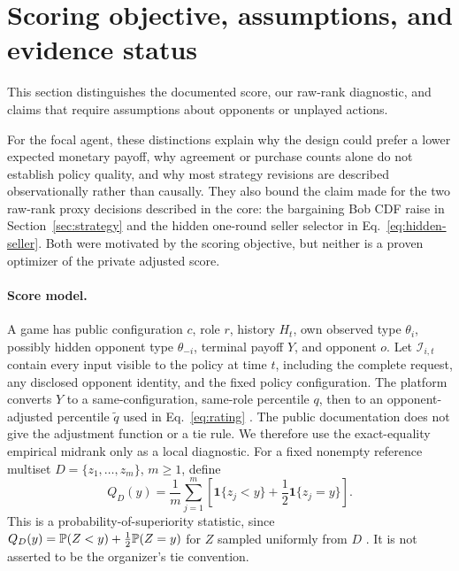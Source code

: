 \raggedbottom
\section{Scoring objective, assumptions, and evidence status}
\label{app:objective}

This section distinguishes the documented score, our raw-rank diagnostic, and
claims that require assumptions about opponents or unplayed actions.

For the focal agent, these distinctions explain why the design could prefer a
lower expected monetary payoff, why agreement or purchase counts alone do not
establish policy quality, and why most strategy revisions are described
observationally rather than causally. They also bound the claim made for the two
raw-rank proxy decisions described in the core: the bargaining Bob CDF raise in
Section~\ref{sec:strategy} and the hidden one-round seller selector in
Eq.~\eqref{eq:hidden-seller}. Both were motivated by the scoring objective, but
neither is a proven optimizer of the private adjusted score.

\paragraph{Score model.}
A game has public configuration $c$, role $r$, history $H_t$, own observed type
$\theta_i$, possibly hidden opponent type $\theta_{-i}$, terminal payoff $Y$,
and opponent $o$. Let $\mathcal I_{i,t}$ contain every input visible to the
policy at time $t$, including the complete request, any disclosed opponent
identity, and the fixed policy configuration. The platform converts $Y$ to a
same-configuration, same-role percentile $q$, then to an opponent-adjusted percentile
$\widetilde q$ used in Eq.~\eqref{eq:rating} \citep{gleecompetition2026}.
The public documentation does not give the adjustment function or a tie rule.
We therefore use the exact-equality empirical midrank only as a local
diagnostic. For a fixed nonempty reference multiset
$D=\{z_1,\ldots,z_m\}$, $m\geq1$, define
\begin{equation}
Q_D(y)=\frac{1}{m}\sum_{j=1}^{m}
\left[\mathbf 1\{z_j<y\}+\frac12\mathbf 1\{z_j=y\}\right].
\label{eq:midrank}
\end{equation}
This is a probability-of-superiority statistic, since
$Q_D(y)=\mathbb{P}(Z<y)+\tfrac12\mathbb{P}(Z=y)$ for $Z$ sampled uniformly from $D$
\citep{mann1947test}. It is not asserted to be the organizer's tie convention.


